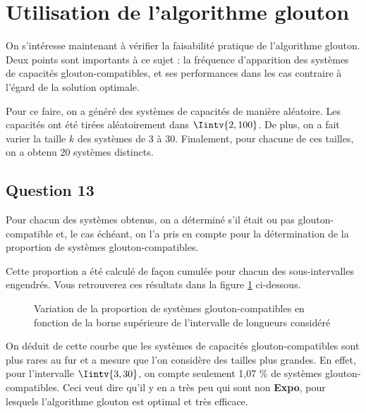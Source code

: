 \documentclass[12pt,a4paper]{article}
\begin{document}
\newpage

\section{Utilisation de l'algorithme glouton}
 On s'int\'eresse maintenant \`a v\'erifier la faisabilit\'e pratique de l'algorithme glouton. Deux points sont importants \`a ce sujet : la fr\'equence d'apparition des syst\`emes de capacit\'es glouton-compatibles, et ses performances dans les cas contraire \`a l'\'egard de la solution optimale.
 
 Pour ce faire, on a g\'en\'er\'e des syst\`emes de capacit\'es de mani\`ere al\'eatoire. Les capacit\'es ont \'et\'e tir\'ees al\'eatoirement dans $\Iintv{2,100}$. De plus, on a fait varier la taille $k$ des syst\`emes de 3 \`a 30. Finalement, pour chacune de ces tailles, on a obtenu 20 syst\`emes distincts.

 \subsection*{Question 13}
 Pour chacun des syst\`emes obtenus, on a d\'etermin\'e s'il \'etait ou pas glouton-compatible et, le cas \'ech\'eant, on l'a pris en compte pour la d\'etermination de la proportion de syst\`emes glouton-compatibles.
 
 Cette proportion a \'et\'e calcul\'e de fa\c{c}on cumul\'ee pour chacun des sous-intervalles engendr\'es. Vous retrouverez ces r\'esultats dans la figure \ref{fig:prop} ci-dessous.
 
\begin{figure}[!h]
  \centering
  \captionsetup{justification=centering}
  \caption[Variation de la proportion de syst\`emes glouton-compatibles]{Variation de la proportion de syst\`emes glouton-compatibles en fonction de la borne sup\'erieure de l'intervalle de longueurs consid\'er\'e}
  \label{fig:prop}
\end{figure}

On d\'eduit de cette courbe que les syst\`emes de capacit\'es glouton-compatibles sont plus rares au fur et a mesure que l'on consid\`ere des tailles plus grandes. En effet, pour l'intervalle $\Iintv{3,30}$, on compte seulement 1,07 \% de syst\`emes glouton-compatibles. Ceci veut dire qu'il y en a tr\`es peu qui sont non {\bfseries Expo}, pour lesquels l'algorithme glouton est optimal et tr\`es efficace.
\end{document}
